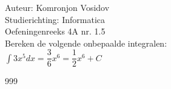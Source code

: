 \documentclass[a4paper]{article}
\newcommand{\dint}{\displaystyle\int}
\begin{document}
	
	\noindent \large Auteur: Komronjon Vosidov \\
	\noindent \large Studierichting: Informatica\\
	\noindent \large Oefeningenreeks 4A nr. 1.5\\
	
	
	\medskip
	\normalsize
	Bereken de volgende onbepaalde integralen:\\
	
	$\dint 3x^5 dx = \dfrac{3}{6}x^6 = \dfrac{1}{2}x^6 + C $ \\
	
	
	
	
	
	
	\begin{thebibliography}{999}
	\end{thebibliography}		
\end{document}
